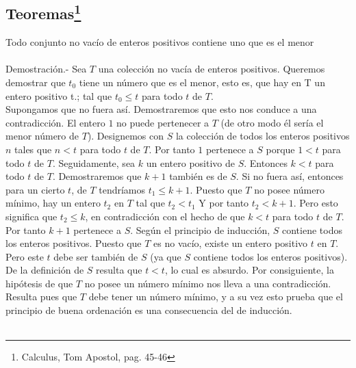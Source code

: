\subsection[Teoremas]{Teoremas\footnote{Calculus, Tom Apostol, pag. 45-46}}

\begin{teo}
Todo conjunto no vacío de enteros positivos contiene uno que es el menor \\\\
Demostración.- \; Sea $T$ una colección no vacía de enteros positivos. Queremos demostrar que $t_0$ tiene un número que es el menor, esto es, que hay en T un entero positivo t.; tal que $t_0\leq t$ para todo $t$ de $T$.\\
Supongamos que no fuera así. Demostraremos que esto nos conduce a una contradicción. El entero $1$ no puede pertenecer a $T$ (de otro modo él sería el menor número de $T$). Designemos con $S$ la colección de todos los enteros positivos $n$ tales que $n<t$ para todo $t$ de $T$. Por tanto $1$ pertenece a $S$ porque $1 < t$ para todo $t$ de $T$. Seguidamente, sea $k$ un entero positivo de $S$. Entonces $k < t$ para todo $t$ de $T$. Demostraremos que $k + 1$ también es de $S$. Si no fuera así, entonces para un cierto $t$, de $T$ tendríamos $t_1 \leq k+1$. Puesto que $T$ no posee número mínimo, hay un entero $t_2$ en $T$ tal que $t_2 < t_1$ Y por tanto $t_2 < k + 1$. Pero esto significa que $t_2 \leq k$, en contradicción con el hecho de que $k < t$ para todo $t$ de $T$. Por tanto $k + 1$ pertenece a $S$. Según el principio de inducción, $S$ contiene todos los enteros positivos. Puesto que $T$ es no vacío, existe un entero positivo $t$ en $T$. Pero este $t$ debe ser también de $S$ (ya que $S$ contiene todos los enteros positivos). De la definición de $S$ resulta que $t < t$, lo cual es absurdo. Por consiguiente, la hipótesis de que $T$ no posee un número mínimo nos lleva a una contradicción. Resulta pues que $T$ debe tener un número mínimo, y a su vez esto prueba que el principio de buena ordenación es una consecuencia del de inducción.\\\\
\end{teo}

